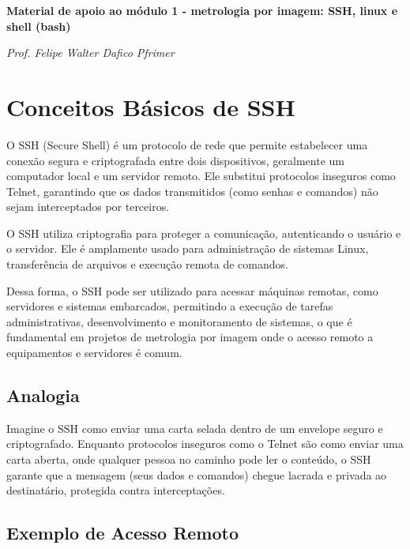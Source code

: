 \documentclass[12pt]{article}
\begin{document}
\begin{center}
\textbf{\Large Material de apoio ao módulo 1 - metrologia por imagem: SSH, linux e shell (bash)}


\vspace{0.5cm}

\textit{Prof. Felipe Walter Dafico Pfrimer}

\vspace{1cm}

\end{center}

\section{Conceitos Básicos de SSH}

O SSH (Secure Shell) é um protocolo de rede que permite estabelecer uma conexão segura e criptografada entre dois dispositivos, geralmente um computador local e um servidor remoto. Ele substitui protocolos inseguros como Telnet, garantindo que os dados transmitidos (como senhas e comandos) não sejam interceptados por terceiros.

O SSH utiliza criptografia para proteger a comunicação, autenticando o usuário e o servidor. Ele é amplamente usado para administração de sistemas Linux, transferência de arquivos e execução remota de comandos.

Dessa forma, o SSH pode ser utilizado para acessar máquinas remotas, como servidores e sistemas embarcados, permitindo a execução de tarefas administrativas, desenvolvimento e monitoramento de sistemas, o que é fundamental em projetos de metrologia por imagem onde o acesso remoto a equipamentos e servidores é comum.

\subsection{Analogia}

Imagine o SSH como enviar uma carta selada dentro de um envelope seguro e criptografado. Enquanto protocolos inseguros como o Telnet são como enviar uma carta aberta, onde qualquer pessoa no caminho pode ler o conteúdo, o SSH garante que a mensagem (seus dados e comandos) chegue lacrada e privada ao destinatário, protegida contra interceptações.

\subsection{Exemplo de Acesso Remoto}
\end{document}

